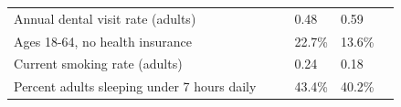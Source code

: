 \documentclass[9pt]{report}
\begin{document}
\begin{tabular}{p{.10in}p{.10in}p{.10in}p{3.7in}>{\hfill}p{.85in}>{\hfill}p{.85in}>{\hfill}p{.85in}>{\hfill}p{.85in}p{0.1in}}
\multicolumn{4}{l}{\parbox{3.6in}{\strut\raggedright{{Annual dental visit rate (adults)}}\strut}} &  &  & 0.48 & 0.59 & \multicolumn{1}{l}{}  \\ 
\multicolumn{4}{l}{\parbox{3.6in}{\strut\raggedright{{Ages 18-64, no health insurance}}\strut}} &  &  & 22.7\% & 13.6\% & \multicolumn{1}{l}{}  \\ 
\multicolumn{4}{l}{\parbox{3.6in}{\strut\raggedright{{Current smoking rate (adults)}}\strut}} &  &  & 0.24 & 0.18 & \multicolumn{1}{l}{}  \\ 
\multicolumn{4}{l}{\parbox{3.6in}{\strut\raggedright{{Percent adults sleeping under 7 hours daily}}\strut}} &  &  & 43.4\% & 40.2\% & \multicolumn{1}{l}{}  \\ 

\end{tabular}
\setlength{\tabcolsep}{6pt} %


\vspace{36pt}
\linespread{1.5}
\theendnotes
\end{document}
